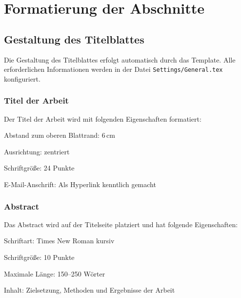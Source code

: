 
\chapter{Formatierung der Abschnitte}
\label{chap:formatierung_abschnitte}

\section{Gestaltung des Titelblattes}
\label{sec:titelblatt}

Die Gestaltung des Titelblattes erfolgt automatisch durch das Template. Alle erforderlichen Informationen werden in der Datei \texttt{Settings/General.tex} konfiguriert.

\subsection*{Titel der Arbeit}
\label{subsec:titel_arbeit}

Der Titel der Arbeit wird mit folgenden Eigenschaften formatiert:
\begin{listenabsatz}
	\item Abstand zum oberen Blattrand: 6\,cm
	\item Ausrichtung: zentriert
	\item Schriftgröße: 24 Punkte
	\item E-Mail-Anschrift: Als Hyperlink kenntlich gemacht
\end{listenabsatz}

\subsection*{Abstract}
\label{subsec:abstract}

Das Abstract wird auf der Titelseite platziert und hat folgende Eigenschaften:
\begin{listenabsatz}
	\item Schriftart: Times New Roman kursiv
	\item Schriftgröße: 10 Punkte
	\item Maximale Länge: 150--250 Wörter
	\item Inhalt: Zielsetzung, Methoden und Ergebnisse der Arbeit
\end{listenabsatz}

